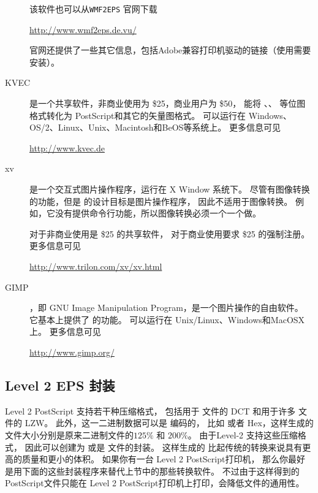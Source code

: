 \begin{description}
	该软件也可以从\texttt{WMF2EPS} 官网下载
	\begin{center}
		\url{http://www.wmf2eps.de.vu/}
	\end{center}
	官网还提供了一些其它信息，包括Adobe兼容打印机驱动的链接（使用需要安装）。
	
	\item[KVEC]
	
	 是一个共享软件，非商业使用为 \$25，商业用户为 \$50，
	能将 、、 等位图格式转化为 PostScript和其它的矢量图格式。
	 可以运行在 Windows、OS/2、Linux、Unix、Macintosh和BeOS等系统上。
	更多信息可见
	\begin{center}
		\url{http://www.kvec.de}
	\end{center}
	
	\item[xv]
	
	 是一个交互式图片操作程序，运行在 X Window 系统下。
	尽管有图像转换的功能，但是  的设计目标是图片操作程序，
	因此不适用于图像转换。
	例如，它没有提供命令行功能，所以图像转换必须一个一个做。
	
	 对于非商业使用是 \$25 的共享软件，
	对于商业使用要求 \$25 的强制注册。
	更多信息可见
	\begin{center}
		\url{http://www.trilon.com/xv/xv.html}
	\end{center}
	
	\item[GIMP]	
	
	，即 GNU Image Manipulation Program，是一个图片操作的自由软件。
	它基本上提供了   的功能。
	 可以运行在 Unix/Linux、Windows和MacOSX上。
	更多信息可见
	\begin{center}
		\url{http://www.gimp.org/}
	\end{center}

\end{description}


\subsection{Level 2 EPS 封装}\label{ssec:epswrapper}
Level 2 PostScript 支持若干种压缩格式，
包括用于  文件的 DCT 和用于许多  文件的 LZW。
此外，这一二进制数据可以是 \ascii 编码的，
比如  或者 \ascii Hex，这样生成的\ascii 文件大小分别是原来二进制文件的$125\percent$ 和 $200\percent$。
由于Level-2 支持这些压缩格式，
因此可以创建为  或是  文件的封装。
这样生成的  比起传统的转换来说具有更高的质量和更小的体积。
如果你有一台 Level 2 PostScript打印机，
那么你最好是用下面的这些封装程序来替代上节中的那些转换软件。
不过由于这样得到的PostScript文件只能在 Level 2 PostScript打印机上打印，会降低文件的通用性。


